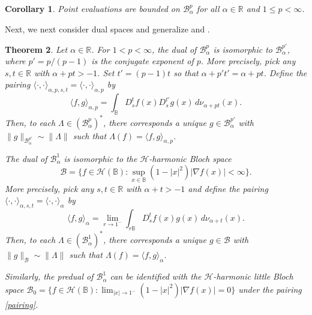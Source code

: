 \documentclass{amsart}
\newtheorem{theorem}{Theorem}[section]
\newtheorem{corollary}[theorem]{Corollary}
\theoremstyle{definition}
\theoremstyle{remark}
\begin{document}
\begin{corollary}\label{CPointeva}
Point evaluations are bounded on $\mathcal B^p_\alpha$ for all
$\alpha\in\mathbb R$ and $1\le p<\infty$.
\end{corollary}

Next, we next consider dual spaces and generalize \cite[Corollary 1.4]{U} and
\cite[Theorem 1.2]{U3}.

\begin{theorem}\label{TDuality}
Let $\alpha\in\mathbb R$.
For $1<p<\infty$, the dual of $\mathcal B^p_\alpha$ is isomorphic
to $\mathcal B^{p'}_\alpha$, where $p'=p/(p-1)$ is the conjugate
exponent of $p$.
More precisely, pick any $s,t\in\mathbb R$ with $\alpha+pt>-1$.
Set $t'=(p-1)t$ so that $\alpha+p't'=\alpha+pt$.
Define the pairing $\langle\cdot,\cdot\rangle_{\alpha,p,s,t}
=\langle\cdot,\cdot\rangle_{\alpha,p}$ by
\begin{equation*}
\langle f,g\rangle_{\alpha,p}
=\int_{\mathbb B} D^t_s f(x) D^{t'}_sg(x)\,d\nu_{\alpha+pt}(x).
\end{equation*}
Then, to each $\Lambda\in(\mathcal B^p_\alpha)^*$, there corresponds
a unique $g\in\mathcal B^{p'}_\alpha$ with
$\|g\|_{\mathcal B^{p'}_\alpha}\sim \|\Lambda\|$ such that
$\Lambda (f)=\langle f,g\rangle_{\alpha,p}$.

The dual of $\mathcal B^1_\alpha$ is isomorphic to the
$\mathcal H$-harmonic Bloch space
\begin{equation*}
\mathcal B=\{f\in\mathcal H(\mathbb B)\colon
\sup_{x\in\mathbb B} (1-\lvert x\rvert^2)\lvert\nabla f(x)\rvert<\infty\}.
\end{equation*}
More precisely, pick any $s,t\in\mathbb R$ with $\alpha+t>-1$ and define
the pairing $\langle\cdot,\cdot\rangle_{\alpha,s,t}
=\langle\cdot,\cdot\rangle_{\alpha}$ by
\begin{equation}\label{pairing}
\langle f,g\rangle_\alpha
=\lim_{r\to1^-}\int_{r\mathbb B} D^t_s f(x) g(x)\,d\nu_{\alpha+t}(x).
\end{equation}
Then, to each $\Lambda\in(\mathcal B^1_\alpha)^*$, there corresponds
a unique $g\in\mathcal B$ with
$\|g\|_{\mathcal B}\sim \|\Lambda\|$ such that
$\Lambda (f)=\langle f,g\rangle_{\alpha}$.

Similarly, the predual of $\mathcal B^1_\alpha$ can be identified
with the $\mathcal H$-harmonic little Bloch space
$\mathcal B_0=\{f\in\mathcal H(\mathbb B)\colon
\lim_{\lvert x\rvert\to 1^-}
(1-\lvert x\rvert^2)\lvert\nabla f(x)\rvert=0\}$
under the pairing \eqref{pairing}.
\end{theorem}
\end{document}
